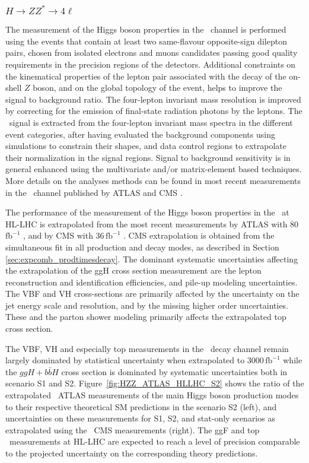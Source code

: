 \subsubsection{$H \to ZZ^* \to 4\ell$}

The measurement of the Higgs boson properties in the \HZZ\ channel is performed using the events that contain at least two same-flavour opposite-sign dilepton pairs, chosen from isolated electrons and muons candidates passing good quality requirements in the precision regions of the detectors. Additional constraints on the kinematical properties of the lepton pair associated with the decay of the on-shell $Z$ boson, and on the global topology of the event, helps to improve the signal to background ratio. The four-lepton invariant mass resolution is improved by correcting for the emission of final-state radiation photons by the leptons.
The \HZZ\ signal is extracted from the four-lepton invariant mass spectra in the different event categories, after having evaluated the background components using simulations to constrain their shapes, and data control regions to extrapolate their normalization in the signal regions. Signal to background sensitivity is in general enhanced using the multivariate and/or matrix-element based techniques. More details on the analyses methods can be found in most recent measurements in the \HZZ\ channel published by ATLAS \cite{ATLAS:2018bsg} and CMS \cite{Sirunyan:2017exp}.

The performance of the measurement of the Higgs boson properties in the \HZZ\ at HL-LHC is extrapolated from the most recent measurements by ATLAS with 80\,$\mathrm{fb}^{-1}$ \cite{ATLAS:2018bsg}, and by CMS with 36\,$\mathrm{fb}^{-1}$ \cite{Sirunyan:2017exp}.
CMS extrapolation is obtained from the simultaneous fit in all production and decay modes, as described in Section \ref{sec:expcomb_prodtimesdecay}.
The dominant systematic uncertainties affecting the extrapolation of the ggH cross section measurement are the lepton reconstruction and identification efficiencies, and pile-up modeling uncertainties. The VBF and VH cross-sections are primarily affected by the uncertainty on the jet energy scale and resolution, and by the
missing higher order uncertainties.
These and
the parton shower modeling primarily affects the extrapolated top cross section.

The VBF, VH and especially top measurements in the \HZZ\ decay channel remain largely dominated by statistical uncertainty when extrapolated to 3000\,$\mathrm{fb}^{-1}$ while the $ggH+b\bar{b}H$ cross section is dominated by systematic uncertainties both in scenario S1 and S2.
%
Figure~\ref{fig:HZZ_ATLAS_HLLHC_S2} shows the ratio of the extrapolated \HZZ\ ATLAS measurements of the main Higgs boson production modes to their respective theoretical SM predictions in the scenario S2 (left), and uncertainties on these measurements for S1, S2, and stat-only scenarios as extrapolated using the \HZZ\ CMS measurements (right). The ggF and top \HZZ\ measurements at HL-LHC are expected to reach a level of precision comparable to the projected uncertainty on the corresponding theory predictions.

